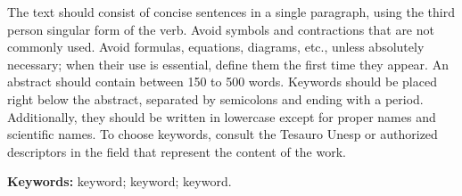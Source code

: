 \documentclass[
  12pt,		%
  a4paper,	%
  openright,  %
  oneside,	%
  chapter=TITLE,		%
  section=TITLE,		%
  english,	%
  french,	    %
  spanish,	%
  brazil	    %
]{abntex2}
\begin{document}
    \begin{resumo}[Abstract] %
    
    The text should consist of concise sentences in a single paragraph, using the third person singular form of the verb. Avoid symbols and contractions that are not commonly used. Avoid formulas, equations, diagrams, etc., unless absolutely necessary; when their use is essential, define them the first time they appear. An abstract should contain between 150 to 500 words. Keywords should be placed right below the abstract, separated by semicolons and ending with a period. Additionally, they should be written in lowercase except for proper names and scientific names. To choose keywords, consult the Tesauro Unesp or authorized descriptors in the field that represent the content of the work.
        
        \vspace*{0.5cm}
        
        \noindent\textbf{{Keywords: }} keyword; keyword; keyword.
    
    \end{resumo}
    
     
    
    
    \listoffigures*
    \newpage
    
    
    \listoftables*
    \newpage
    
\end{document}
